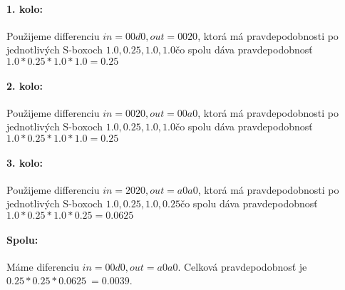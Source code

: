 \paragraph{1. kolo:}
Použijeme differenciu $in= 00d0 , out= 0020 $,
ktorá má pravdepodobnosti po jednotlivých S-boxoch $
1.0,0.25,1.0,1.0
$čo spolu dáva pravdepodobnosť 
$ 1.0*0.25*1.0*1.0 = 0.25 $

\paragraph{2. kolo:}
Použijeme differenciu $in= 0020 , out= 00a0 $,
ktorá má pravdepodobnosti po jednotlivých S-boxoch $
1.0,0.25,1.0,1.0
$čo spolu dáva pravdepodobnosť 
$ 1.0*0.25*1.0*1.0 = 0.25 $

\paragraph{3. kolo:}
Použijeme differenciu $in= 2020 , out= a0a0 $,
ktorá má pravdepodobnosti po jednotlivých S-boxoch $
1.0,0.25,1.0,0.25
$čo spolu dáva pravdepodobnosť 
$ 1.0*0.25*1.0*0.25 = 0.0625 $

\paragraph{Spolu:}  Máme diferenciu $in= 00d0 , out= a0a0 $.
Celková pravdepodobnosť je $ 0.25*0.25*0.0625 ~= 0.0039 $.
